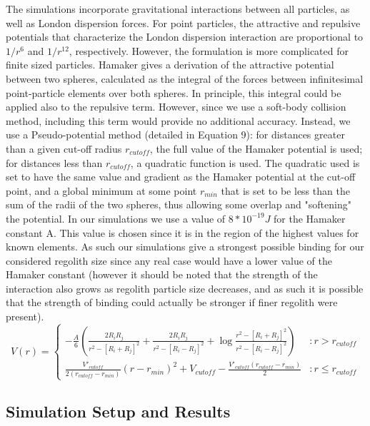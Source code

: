 \documentclass[letterpaper, preprint, paper,11pt]{AAS}	%
\begin{document}
The simulations incorporate gravitational interactions between all particles, as well as London dispersion forces. For point particles, the attractive and repulsive potentials that characterize the London dispersion interaction are proportional to ${1}/{r^6}$ and ${1}/{r^{12}}$, respectively. However, the formulation is more complicated for finite sized particles. Hamaker\cite{hamaker} gives a derivation of the attractive potential between two spheres, calculated as the integral of the forces between infinitesimal point-particle elements over both spheres. In principle, this integral could be applied also to the repulsive term. However, since we use a soft-body collision method, including this term would provide no additional accuracy. Instead, we use a Pseudo-potential method (detailed in Equation 9): for distances greater than a given cut-off radius $r_{cutoff}$, the full value of the Hamaker\cite{hamaker} potential is used; for distances less than $r_{cutoff}$, a quadratic function is used. The quadratic used is set to have the same value and gradient as the Hamaker\cite{hamaker} potential at the cut-off point, and a global minimum at some point $r_{min}$ that is set to be less than the sum of the radii of the two spheres, thus allowing some overlap and "softening" the potential. In our simulations we use a value of $8*10^{-19} J$ for the Hamaker constant A. This value is chosen since it is in the region of the highest values for known elements. As such our simulations give a strongest possible binding for our considered regolith size since any real case would have a lower value of the Hamaker constant (however it should be noted that the strength of the interaction also grows as regolith particle size decreases, and as such it is possible that the strength of binding could actually be stronger if finer regolith were present).
\begin{equation}
V(r) = \left\{
\begin{array}{lr}
-\frac{A}{6}\left(\frac{2R_iR_j}{r^2-[R_i+R_j]^2}+\frac{2R_iR_j}{r^2-[R_i-R_j]^2}+\log\frac{r^2-[R_i+R_j]^2}{r^2-[R_i-R_j]^2}\right) & : r > r_{cutoff}\\
\frac{V'_{cutoff}}{2(r_{cutoff}-r_{min})}(r-r_{min})^2+V_{cutoff} - \frac{V'_{cutoff}(r_{cutoff}-r_{min})}{2} & : r \leq r_{cutoff}
\end{array}
\right.
\end{equation}

\subsection{Simulation Setup and Results}
\end{document}
